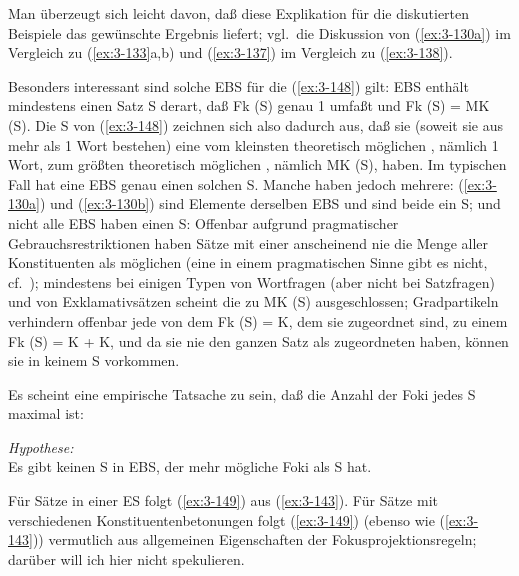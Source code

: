 \documentclass[output=paper]{langsci/langscibook}
\begin{document}
Man überzeugt sich leicht davon, daß diese Explikation für die diskutierten Beispiele das gewünschte Ergebnis liefert; vgl.\ die Diskussion von (\ref{ex:3-130a}) im Vergleich zu (\ref{ex:3-133}a,b) und (\ref{ex:3-137}) im Vergleich zu (\ref{ex:3-138}).

Besonders interessant sind solche EBS für die (\ref{ex:3-148}) gilt:
\ea
\label{ex:3-148}
EBS enthält mindestens einen Satz S derart, daß Fk (S) genau
1  umfaßt und Fk (S) = MK (S).
\z
Die S von (\ref{ex:3-148}) zeichnen sich also dadurch aus, daß sie (soweit sie aus mehr als 1 Wort bestehen) eine  vom kleinsten theoretisch möglichen , nämlich 1 Wort, zum größten theoretisch möglichen , nämlich MK (S), haben. Im typischen Fall hat eine EBS genau einen solchen S. Manche haben jedoch mehrere: (\ref{ex:3-130a}) und (\ref{ex:3-130b}) sind Elemente derselben EBS und sind beide ein S; und nicht alle EBS haben einen S: Offenbar aufgrund pragmatischer Gebrauchsrestriktionen haben Sätze mit einer  anscheinend nie die Menge aller Konstituenten als möglichen  (\dash eine  in einem pragmatischen Sinne gibt es nicht, cf.\ \citet{Givon78}); mindestens bei einigen Typen von Wortfragen (aber nicht bei Satzfragen) und von Exklamativsätzen scheint die  zu MK (S) ausgeschlossen; Gradpartikeln verhindern offenbar jede  von dem Fk (S) = K, dem sie zugeordnet sind, zu einem Fk (S) = K + K, und da sie nie den ganzen Satz als zugeordneten  haben, können sie in keinem S vorkommen.

Es scheint eine empirische Tatsache zu sein, daß die Anzahl der Foki
jedes S maximal ist:
\begin{exe}
\ex
\label{ex:3-149}
\textit{Hypothese:} \\
Es gibt keinen S in EBS, der mehr mögliche Foki als S hat.
\end{exe}
Für Sätze in einer ES folgt (\ref{ex:3-149}) aus (\ref{ex:3-143}). Für Sätze mit
verschiedenen Konstituentenbetonungen folgt (\ref{ex:3-149}) (ebenso wie (\ref{ex:3-143}))
vermutlich aus allgemeinen Eigenschaften der Fokusprojektionsregeln;
darüber will ich hier nicht spekulieren.
\end{document}
